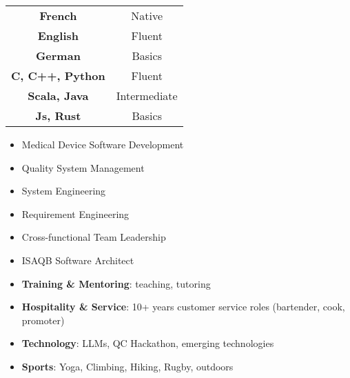 %
%
%

\threecolumnsection
{
\vspace{1em}
\hspace*{-5mm}\begin{tabular}{cc}
  \textbf{French}  & Native \\
  \textbf{English}   & Fluent \\
  \textbf{German} & Basics \\
  \textbf{C, C++, Python} & Fluent \\
  \textbf{Scala, Java} & Intermediate \\
  \textbf{Js, Rust} & Basics
\end{tabular}
}
{
\vspace{1em}
\begin{itemize}
	\item Medical Device Software Development
    \item Quality System Management
    \item System Engineering
    \item Requirement Engineering
    \item Cross-functional Team Leadership
    \item ISAQB Software Architect
\end{itemize}
}
{
\vspace{1em}
\hspace*{-5mm}\begin{itemize}
	\item \textbf{Training \& Mentoring}: teaching, tutoring
	\item \textbf{Hospitality \& Service}: 10+ years customer service roles (bartender, cook, promoter)
    \item \textbf{Technology}: LLMs, QC Hackathon, emerging technologies
    \item \textbf{Sports}: Yoga, Climbing, Hiking, Rugby, outdoors
\end{itemize}
}
